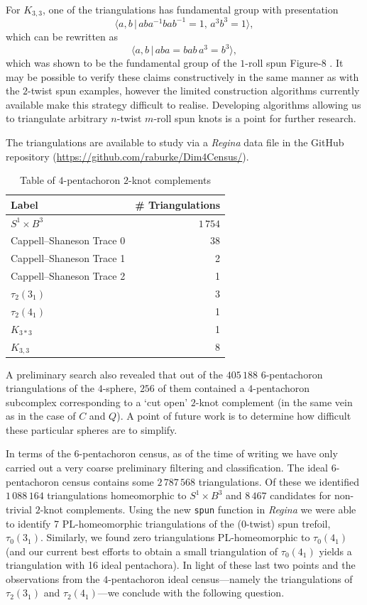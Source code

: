\documentclass[pdflatex,sn-mathphys-num]{sn-jnl}
\theoremstyle{thmstyleone}%
\theoremstyle{thmstyletwo}%
\theoremstyle{thmstylethree}%
\theoremstyle{remark}
\begin{document}
For $K_{3,3}$, one of the triangulations has fundamental group with presentation
\[
	\langle a,b\,\vert\, aba^{-1}bab^{-1}=1,\,a^3b^3=1\rangle,
\]
which can be rewritten as
\[
	\langle a,b\,\vert\,aba=bab\,a^3=b^3\rangle,
\]
which was shown to be the fundamental group of the $1$-roll spun Figure-8 \cite{fox-rolling}.
It may be possible to verify these claims constructively in the same manner as with the $2$-twist spun examples, however the limited construction algorithms currently available make this strategy difficult to realise.
Developing algorithms allowing us to triangulate arbitrary $n$-twist $m$-roll spun knots is a point for further research.

The triangulations are available to study via a \emph{Regina} data file in the GitHub repository (\url{https://github.com/raburke/Dim4Census/}).

\begin{table}[h]
	\caption{Table of $4$-pentachoron $2$-knot complements}
	\label{tab:4p2Knots}
	\begin{tabular}{lr}
		\toprule
	Label & \# Triangulations \\
	\midrule
	$S^1\times B^3$ & $1\,754$\\
	Cappell--Shaneson Trace 0 & 38\\
	Cappell--Shaneson Trace 1 & 2\\
	Cappell--Shaneson Trace 2 & 1\\
	$\tau_2(3_1)$ & 3\\
	$\tau_2(4_1)$ & 1\\
	$K_{3*3}$ & 1\\
	$K_{3,3}$ & 8\\
	\bottomrule
	\end{tabular}
\end{table}

A preliminary search also revealed that out of the $405\,188$ $6$-pentachoron triangulations of the $4$-sphere, $256$ of them contained a $4$-pentachoron subcomplex corresponding to a `cut open' $2$-knot complement (in the same vein as in the case of $C$ and $Q$). A point of future work is to determine how difficult these particular spheres are to simplify.

In terms of the $6$-pentachoron census, as of the time of writing we have only carried out a very coarse preliminary filtering and classification. The ideal $6$-pentachoron census contains some $2\,787\,568$ triangulations. Of these we identified $1\,088\,164$ triangulations homeomorphic to $S^1\times B^3$ and $8\,467$ candidates for non-trivial $2$-knot complements. Using the new \texttt{spun} function in \emph{Regina} we were able to identify 7 PL-homeomorphic triangulations of the ($0$-twist) spun trefoil, $\tau_0(3_1)$. Similarly, we found zero triangulations PL-homeomorphic to $\tau_0(4_1)$ (and our current best efforts to obtain a small triangulation of $\tau_0(4_1)$ yields a triangulation with 16 ideal pentachora). In light of these last two points and the observations from the $4$-pentachoron ideal census---namely the triangulations of $\tau_2(3_1)$ and $\tau_2(4_1)$---we conclude with the following question. 
\end{document}
